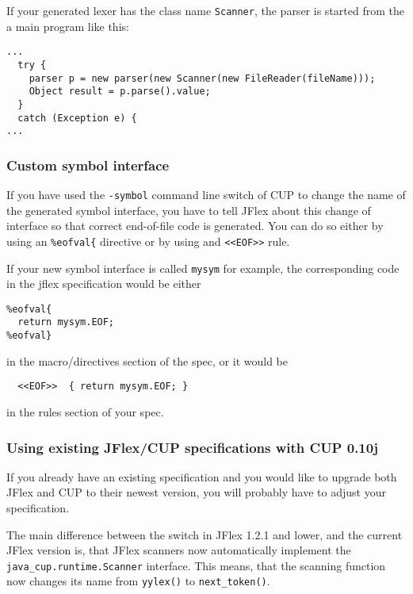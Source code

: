 \documentclass[11pt]{scrartcl}
\newcommand{\xsmall}{}
\begin{document}
If your generated lexer has the class name \texttt{Scanner}, the parser
is started from the a main program like this:

{\xsmall\begin{verbatim}
...
  try {
    parser p = new parser(new Scanner(new FileReader(fileName)));
    Object result = p.parse().value;
  }
  catch (Exception e) {
...
\end{verbatim}
}

\subsubsection{Custom symbol interface}
If you have used the \texttt{-symbol} command line switch of CUP to change
the name of the generated symbol interface, you have to tell JFlex about
this change of interface so that correct end-of-file code is generated. 
You can do so either by using an \verb+%eofval{+ directive or by using
and \texttt{<<EOF>>} rule. 

If your new symbol interface is called \texttt{mysym} for example, the
corresponding code in the jflex specification would be either

{\xsmall
\begin{verbatim}
%eofval{
  return mysym.EOF;
%eofval}
\end{verbatim}
}

in the macro/directives section of the spec, or it would be

{\xsmall
\begin{verbatim}
  <<EOF>>  { return mysym.EOF; }
\end{verbatim}
}

in the rules section of your spec.

\subsubsection{Using existing JFlex/CUP specifications with CUP 0.10j}
If you already have an existing specification and you would like to upgrade
both JFlex and CUP to their newest version, you will probably have to adjust
your specification.

The main difference between the \texttt{} switch in
JFlex 1.2.1 and lower, and the current JFlex version is, that JFlex scanners
now automatically implement the \texttt{java\_cup.runtime.Scanner} interface.
This means, that the scanning function now changes its name from \texttt{yylex()}
to \texttt{next\_token()}. 
\end{document}
